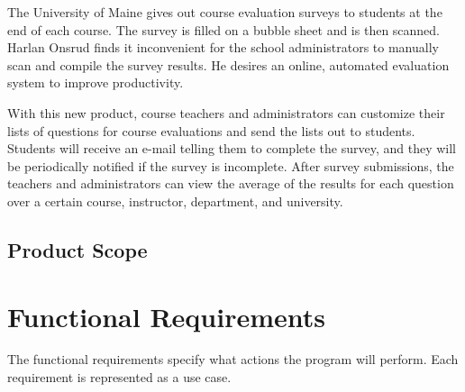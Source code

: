 \documentclass{article}
\begin{document}
The University of Maine gives out course evaluation surveys to students at the end of each course. The survey is filled on a bubble sheet and is then scanned. Harlan Onsrud finds it inconvenient for the school administrators to manually scan and compile the survey results. He desires an online, automated evaluation system to improve productivity.\par

With this new product, course teachers and administrators can customize their lists of questions for course evaluations and send the lists out to students. Students will receive an e-mail telling them to complete the survey, and they will be periodically notified if the survey is incomplete. After survey submissions, the teachers and administrators can view the average of the results for each question over a certain course, instructor, department, and university.

\subsection{Product Scope}

\section{Functional Requirements}

The functional requirements specify what actions the program will perform. Each requirement is represented as a use case.
\end{document}
